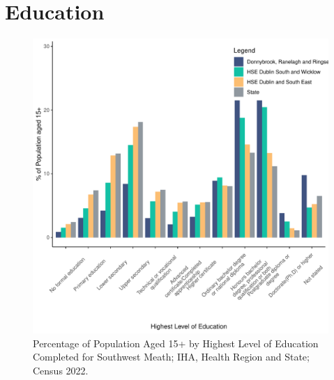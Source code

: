 \documentclass{article}
\begin{document}
\section{Education}\label{sect:Edu}
\begin{figure}[H]
	\centering
	\includegraphics[width = 120mm]{../figures/EduED.pdf}
	\caption{Percentage of Population Aged 15+ by Highest Level of Education Completed for Southwest Meath; IHA, Health Region and State; Census 2022.}
	\label{fig:vbnv}
	\end{figure}
\end{document}

